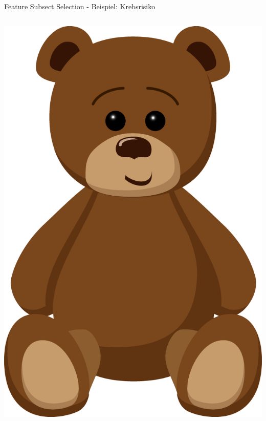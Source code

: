 \documentclass[xcolor=dvipsnames]{beamer}
\begin{document}
    \begin{frame}{Feature Subsect Selection - Beispiel: Krebsrisiko}
        \pause
        \begin{columns}
            \begin{column}{0.3\textwidth}
                    \center
                     \includegraphics[width=(\textwidth / 3)]{img/teddy.png}

\end{column}
\end{columns}
\end{frame}
\end{document}
